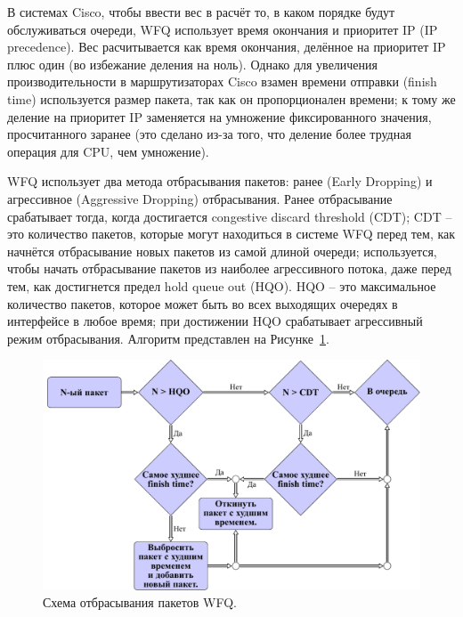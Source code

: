     В системах Cisco, чтобы ввести вес в расчёт то, в каком порядке будут обслуживаться очереди,
    WFQ использует время окончания и приоритет IP (IP precedence). Вес расчитывается
    как время окончания, делённое на приоритет IP плюс один (во избежание деления
    на ноль). Однако для увеличения производительности в маршрутизаторах Cisco
    взамен времени отправки (finish time) используется размер пакета, так как он
    пропорционален времени; к тому же деление на приоритет IP заменяется на умножение
    фиксированного значения, просчитанного заранее (это сделано из-за того,
    что деление более трудная операция для CPU, чем умножение).\cite{Vagesna}

    WFQ использует два метода отбрасывания пакетов: ранее (Early Dropping) и агрессивное
    (Aggressive Dropping) отбрасывания. Ранее отбрасывание срабатывает тогда, когда
    достигается congestive discard threshold (CDT); CDT -- это количество пакетов, которые могут
    находиться в системе WFQ перед тем, как начнётся отбрасывание новых пакетов
    из самой длиной очереди; используется, чтобы начать отбрасывание пакетов
    из наиболее агрессивного потока, даже перед тем, как достигнется предел
    hold queue out (HQO). HQO -- это максимальное количество пакетов, которое может быть
    во всех выходящих очередях в интерфейсе в любое время; при достижении HQO
    срабатывает агрессивный режим отбрасывания. Алгоритм представлен на Рисунке~\ref{pic:wfqdropalgo}.
    \cite{wfqdrop}

    \begin{figure}[ht!]
			\center
        \includegraphics{./pdfimages/fwfq_drop.pdf}
        \caption{Схема отбрасывания пакетов WFQ.}
		\label{pic:wfqdropalgo}
    \end{figure}


